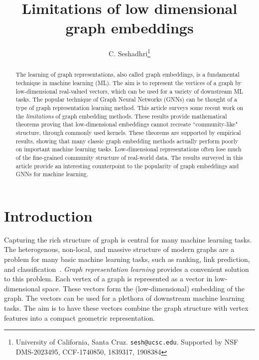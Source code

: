 \documentclass[11pt]{article}
\begin{document}
\title{Limitations of low dimensional graph embeddings}

\author{C. Seshadhri\footnote{University of California, Santa Cruz. {\tt sesh@ucsc.edu}. Supported by NSF DMS-2023495, CCF-1740850, 1839317, 1908384}}

\date{}
\maketitle
\renewcommand\thesection{\arabic{section}}
\setcounter{section}{0}
\setcounter{figure}{0}
\setcounter{table}{0}

\begin{abstract}
The learning of graph representations, also called graph embeddings, is a fundamental technique in machine learning (ML).
The aim is to represent the vertices of a graph by low-dimensional real-valued vectors, which can be 
used for a variety of downstream ML tasks. The popular technique of Graph Neural Networks (GNNs) can
be thought of a type of graph representation learning method. This article surveys some recent work on the \emph{limitations}
of graph embedding methods. These results provide mathematical theorems proving that low-dimensional
embeddings cannot recreate ``community-like" structure, through commonly used kernels. These theorems
are supported by empirical results, showing that many classic graph embedding methods actually perform
poorly on important machine learning tasks. Low-dimensional representations often lose
much of the fine-grained community structure of real-world data. The results surveyed in this article
provide an interesting counterpoint to the popularity of graph embeddings and GNNs for machine learning.
\end{abstract}

\section{Introduction}

Capturing the rich structure of graph is central for many machine learning tasks.
The heterogenous, non-local, and massive structure
of modern graphs are a problem for many basic machine learning tasks,
such as ranking, link prediction, and classification~\cite{easley2010networks}.
\emph{Graph representation learning} provides a
convenient solution to this problem. Each vertex
of a graph is represented as a vector in low-dimensional space. 
These vectors form the (low-dimensional) embedding of the graph.
The vectors can be used for a plethora of downstream machine learning tasks.
The aim is to have these vectors combine the graph structure with vertex features into
a compact geometric representation.
\end{document}
